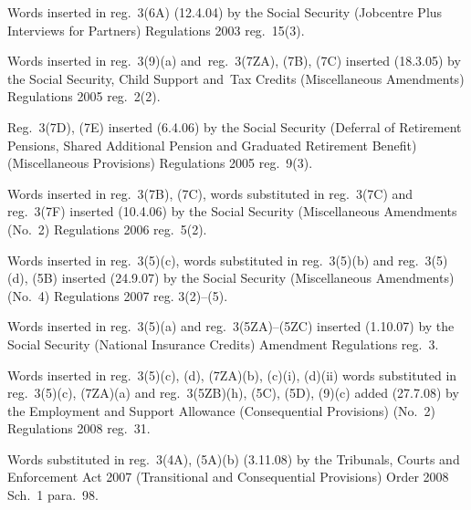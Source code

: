 \documentclass[12pt,a4paper]{article}
\begin{document}
{Words inserted in reg.~3(6A) (12.4.04) by the Social Security (Jobcentre Plus Interviews for Partners) Regulations 2003 reg.~15(3).

Words inserted in reg.~3(9)(a) and~reg.~3(7ZA), (7B), (7C) inserted (18.3.05) by the Social Security, Child Support and~Tax Credits (Miscellaneous Amendments) Regulations 2005 reg.~2(2).

Reg.~3(7D), (7E) inserted (6.4.06) by the Social Security (Deferral of Retirement Pensions, Shared Additional Pension and Graduated Retirement Benefit) (Miscellaneous Provisions) Regulations 2005 reg.~9(3).

Words inserted in reg.~3(7B), (7C), words substituted in reg.~3(7C) and reg.~3(7F) inserted (10.4.06) by the Social Security (Miscellaneous Amendments (No.~2) Regulations 2006 reg.~5(2).

Words inserted in reg.~3(5)(c), words substituted in reg.~3(5)(b) and reg.~3(5)(d), (5B) inserted (24.9.07) by the Social Security (Miscellaneous Amendments) (No.~4) Regulations 2007 reg. 3(2)--(5).

Words inserted in reg.~3(5)(a) and reg.~3(5ZA)--(5ZC) inserted (1.10.07) by the Social Security (National Insurance Credits) Amendment Regulations reg.~3.

Words inserted in reg.~3(5)(c), (d), (7ZA)(b), (c)(i), (d)(ii) words substituted in reg.~3(5)(c), (7ZA)(a) and reg.~3(5ZB)(h), (5C), (5D), (9)(c) added (27.7.08) by the Employment and Support Allowance (Consequential Provisions) (No.~2) Regulations 2008 reg.~31.

Words substituted in reg.~3(4A), (5A)(b) (3.11.08) by the Tribunals, Courts and Enforcement Act 2007 (Transitional and Consequential Provisions) Order 2008 Sch.~1 para.~98.
}
\end{document}
